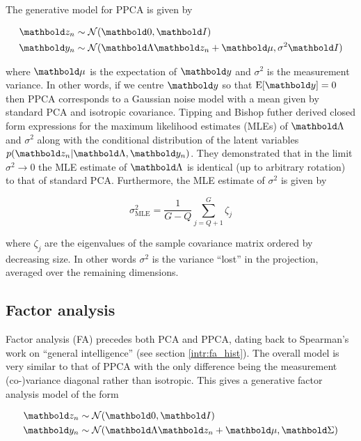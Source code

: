 The generative model for PPCA is given by

\begin{equation}
  \begin{aligned}
    \mbz_n & \sim \Norm(\mbzero, \mbI) \\
    \mby_n & \sim \Norm(\mbLambda \mbz_n + \mbmu, \sigma^2 \mbI)
  \end{aligned}
\end{equation}

where $\mbmu$ is the expectation of $\mby$ and $\sigma^2$ is the measurement variance. In other words, if we centre $\mby$ so that $\text{E}[\mby] = 0$ then PPCA corresponds to a Gaussian noise model with a mean given by standard PCA and isotropic covariance. Tipping and Bishop futher derived closed form expressions for the maximum likelihood estimates (MLEs) of $\mbLambda$ and $\sigma^2$ along with the conditional distribution of the latent variables $p(\mbz_n | \mbLambda, \mby_n)$. They demonstrated that in the limit $\sigma^2 \rightarrow 0$ the MLE estimate of $\mbLambda$ is identical (up to arbitrary rotation) to that of standard PCA. Furthermore, the MLE estimate of $\sigma^2$ is given by

\begin{equation}
  \sigma^2_{\text{MLE}} = \frac{1}{G-Q} \sum_{j = Q + 1}^G \zeta_j
\end{equation}

where $\zeta_j$ are the eigenvalues of the sample covariance matrix ordered by decreasing size. In other words $\sigma^2$ is the variance ``lost'' in the projection, averaged over the remaining dimensions.

\subsection{Factor analysis} \label{sec:intr:fa}

Factor analysis (FA) precedes both PCA and PPCA, dating back to Spearman's work on ``general intelligence'' \cite{spearman1904general} (see section \ref{intr:fa_hist}). The overall model is very similar to that of PPCA with the only difference being the measurement (co-)variance diagonal rather than isotropic. This gives a generative factor analysis model of the form

\begin{equation}
  \begin{aligned}
    \mbz_n & \sim \Norm(\mbzero, \mbI) \\
    \mby_n & \sim \Norm(\mbLambda \mbz_n + \mbmu, \mbSigma)
  \end{aligned}
\end{equation}

